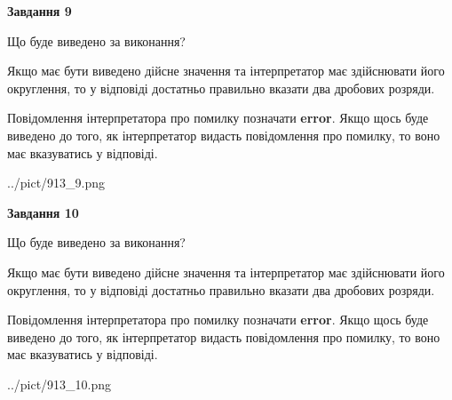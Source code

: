 \documentclass[12pt, ukrainian]{article}
\begin{document}
{\begin {Large}
{\begin {center}\textbf{Завдання 9}\end {center}}\par
Що буде виведено за виконання? \par

Якщо має бути виведено дійсне значення та інтерпретатор має здійснювати його округлення, 
то у відповіді достатньо правильно вказати два дробових розряди.

Повідомлення інтерпретатора про помилку позначати \textbf{error}.
Якщо щось буде виведено до того, як інтерпретатор видасть повідомлення про помилку, 
то воно має вказуватись у відповіді. \par

\begin{center}
	{../pict/913_9.png}
\end{center}
\newpage

{\begin {center}\textbf{Завдання 10}\end {center}}\par
Що буде виведено за виконання? \par

Якщо має бути виведено дійсне значення та інтерпретатор має здійснювати його округлення, 
то у відповіді достатньо правильно вказати два дробових розряди.

Повідомлення інтерпретатора про помилку позначати \textbf{error}.
Якщо щось буде виведено до того, як інтерпретатор видасть повідомлення про помилку, 
то воно має вказуватись у відповіді. \par

\begin{center}
	{../pict/913_10.png}
\end{center}
\newpage

\end {Large}}
\end{document}
